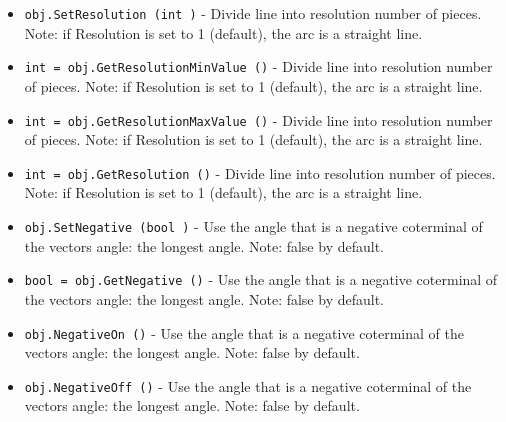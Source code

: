 \begin{itemize}
\item  \verb|obj.SetResolution (int )| -  Divide line into resolution number of pieces.
 Note: if Resolution is set to 1 (default), the arc is a 
 straight line.

\item  \verb|int = obj.GetResolutionMinValue ()| -  Divide line into resolution number of pieces.
 Note: if Resolution is set to 1 (default), the arc is a 
 straight line.

\item  \verb|int = obj.GetResolutionMaxValue ()| -  Divide line into resolution number of pieces.
 Note: if Resolution is set to 1 (default), the arc is a 
 straight line.

\item  \verb|int = obj.GetResolution ()| -  Divide line into resolution number of pieces.
 Note: if Resolution is set to 1 (default), the arc is a 
 straight line.

\item  \verb|obj.SetNegative (bool )| -  Use the angle that is a negative coterminal of the vectors angle:
 the longest angle.
 Note: false by default.

\item  \verb|bool = obj.GetNegative ()| -  Use the angle that is a negative coterminal of the vectors angle:
 the longest angle.
 Note: false by default.

\item  \verb|obj.NegativeOn ()| -  Use the angle that is a negative coterminal of the vectors angle:
 the longest angle.
 Note: false by default.

\item  \verb|obj.NegativeOff ()| -  Use the angle that is a negative coterminal of the vectors angle:
 the longest angle.
 Note: false by default.

\end{itemize}
